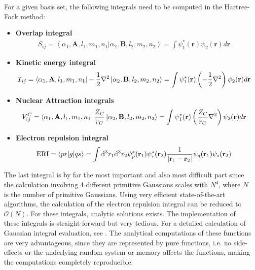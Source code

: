 \documentclass[twoside,        %
			   11pt,			%
               BCOR10mm,       %
               ngerman,english  %
               ]{scrartcl}
\begin{document}
For a given basis set, the following integrals need to be computed in the Hartree-Fock method:
\begin{itemize}
\item \textbf{Overlap integral}
\begin{align*}
S_{ij} = \left<\alpha_1, \mathbf{A}, l_1, m_1, n_1 |\alpha_2, \mathbf{B}, l_2, m_2, n_2 \right> = \int \psi_1^*(\mathbf{r})
\psi_2(\mathbf{r})d\mathbf{r}
\end{align*}
\item \textbf{Kinetic energy integral}
\begin{align*}
T_{ij} = \bra{\alpha_1, \mathbf{A}, l_1, m_1, n_1}-\frac{1}{2}\nabla^2\ket{\alpha_2, \mathbf{B}, l_2, m_2, n_2} = \int \psi_1^*(\mathbf{r})\left( -\frac{1}{2}\nabla^2\right)
\psi_2(\mathbf{r})d\mathbf{r}
\end{align*}
\item \textbf{Nuclear Attraction integrals}
\begin{align*}
V_{ij}^C = \bra{\alpha_1, \mathbf{A}, l_1, m_1, n_1}\frac{Z_C}{r_C}\ket{\alpha_2, \mathbf{B}, l_2, m_2, n_2} = \int \psi_1^*(\mathbf{r})\left(\frac{Z_C}{r_C}\nabla^2\right)
\psi_2(\mathbf{r})d\mathbf{r}
\end{align*}
\item \textbf{Electron repulsion integral}
\begin{align*}
\text{ERI} = \left<pr|g|qs\right> = \int \mathrm{d}^3 r_1 \mathrm{d}^3 r_2 \psi_p^*(\mathbf{r}_1) \psi_r^*(\mathbf{r}_2) \frac{1}{\left| \mathbf{r}_1 -\mathbf{r}_2 \right|} \psi_q(\mathbf{r}_1) \psi_s(\mathbf{r}_2)
\end{align*}
\end{itemize} The last integral is by far the most important and also most difficult part since the calculation involving 4 different primitive Gaussians scales with $N^4$, where $N$ is the number of primitive Gaussians. Using very efficient state-of-the-art algorithms, the calculation of the electron repulsion integral can be reduced to $\mathcal{O}(N)$.
For these integrals, analytic solutions exists. The implementation of these integrals is straight-forward but very tedious. For a detailed calculation of Gaussian integral evaluation, see \cite{fermann1997fundamentals, petersson2009detailed, gill1989efficient, huzinaga1985basis, raffenetti1973general}. 
The analytical computations of these functions are very advantageous, since they are represented by pure functions, i.e. no side-effects or the underlying random system or memory affects the functions, making the computations completely reproducible.
\end{document}
